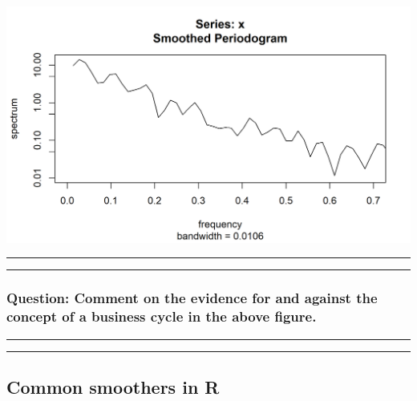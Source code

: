 \documentclass[]{article}
\begin{document}
\begin{center}\includegraphics{figure/intro-zoomed_spectrum-1} \end{center}

\begin{center}\rule{0.5\linewidth}{\linethickness}\end{center}

\begin{center}\rule{0.5\linewidth}{\linethickness}\end{center}

\subsubsection{Question: Comment on the evidence for and against the
concept of a business cycle in the above
figure.}\label{question-comment-on-the-evidence-for-and-against-the-concept-of-a-business-cycle-in-the-above-figure.}

\begin{center}\rule{0.5\linewidth}{\linethickness}\end{center}

\begin{center}\rule{0.5\linewidth}{\linethickness}\end{center}

\subsection{Common smoothers in R}\label{common-smoothers-in-r}
\end{document}
